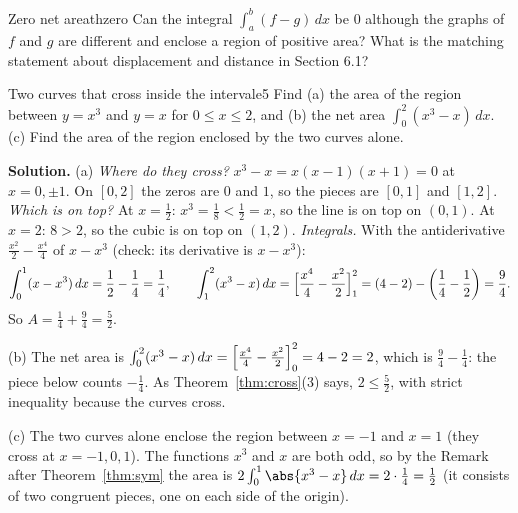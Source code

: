\documentclass[11pt]{article}
\begin{document}
\begin{think}{Zero net area}{thzero}
Can the integral $\int_a^b(f-g)\,dx$ be $0$ although the graphs of $f$ and $g$ are different and enclose a region of positive area? What is the matching statement about displacement and distance in Section 6.1?
\end{think}

\begin{exmp}{Two curves that cross inside the interval}{e5}
Find (a) the area of the region between $y=x^3$ and $y=x$ for $0\le x\le2$, and (b) the net area $\int_0^2(x^3-x)\,dx$. (c) Find the area of the region enclosed by the two curves alone.

\textbf{Solution.} (a) \emph{Where do they cross?} $x^3-x=x(x-1)(x+1)=0$ at $x=0,\pm1$. On $[0,2]$ the zeros are $0$ and $1$, so the pieces are $[0,1]$ and $[1,2]$.
\emph{Which is on top?} At $x=\frac12$: $x^3=\frac18<\frac12=x$, so the line is on top on $(0,1)$. At $x=2$: $8>2$, so the cubic is on top on $(1,2)$.
\emph{Integrals.} With the antiderivative $\frac{x^2}2-\frac{x^4}4$ of $x-x^3$ (check: its derivative is $x-x^3$):
\[
\int_0^1(x-x^3)\,dx=\frac12-\frac14=\frac14,\qquad
\int_1^2(x^3-x)\,dx=\Bigl[\frac{x^4}4-\frac{x^2}2\Bigr]_1^2=(4-2)-\left(\frac14-\frac12\right)=\frac94.
\]
So $A=\frac14+\frac94=\frac52$.

(b) The net area is $\int_0^2(x^3-x)\,dx=\Bigl[\frac{x^4}4-\frac{x^2}2\Bigr]_0^2=4-2=2$, which is $\frac94-\frac14$: the piece below counts $-\frac14$. As Theorem~\ref{thm:cross}(3) says, $2\le\frac52$, with strict inequality because the curves cross.

(c) The two curves alone enclose the region between $x=-1$ and $x=1$ (they cross at $x=-1,0,1$). The functions $x^3$ and $x$ are both odd, so by the Remark after Theorem~\ref{thm:sym} the area is $2\int_0^1\abs{x^3-x}\,dx=2\cdot\frac14=\frac12$ (it consists of two congruent pieces, one on each side of the origin).


\end{exmp}
\end{document}
